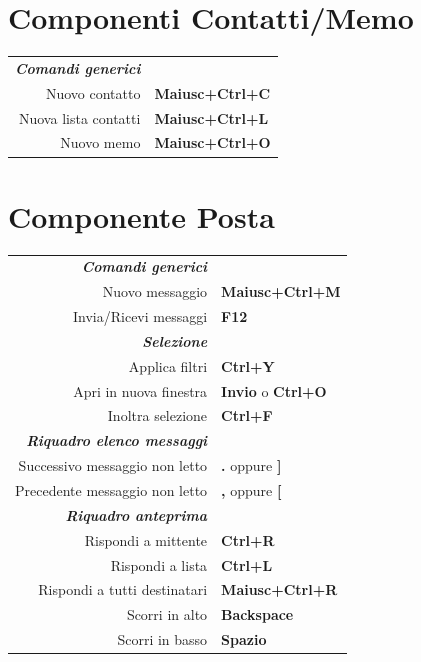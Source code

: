 \documentclass[12pt]{article}
\begin{document}
\begin{landscape}
\begin{center}
\begin{multicols}{2}
	\section*{Componenti Contatti/Memo}
	\begin{tabular*}{4in}{rp{1.5in}}
		\textit{\textbf{Comandi generici}}	&					\\
		Nuovo contatto				& \textbf{Maiusc+Ctrl+C}			\\
		Nuova lista contatti			& \textbf{Maiusc+Ctrl+L}			\\
		Nuovo memo				& \textbf{Maiusc+Ctrl+O}			\\
	\end{tabular*}
	\section*{Componente Posta}
	\begin{tabular*}{4in}{rp{1.5in}}
		\textit{\textbf{Comandi generici}}	&					\\
		Nuovo messaggio				& \textbf{Maiusc+Ctrl+M}			\\
		\vspace{1.5mm}
		Invia/Ricevi messaggi			& \textbf{F12}				\\
		\textit{\textbf{Selezione}}		&					\\
		Applica filtri				& \textbf{Ctrl+Y}			\\
		Apri in nuova finestra 			& \textbf{Invio} o \textbf{Ctrl+O}	\\
		\vspace{1.5mm}
		Inoltra selezione			& \textbf{Ctrl+F}			\\
		\textit{\textbf{Riquadro elenco messaggi}}	&					\\
		Successivo messaggio non letto		& \textbf{.} oppure \textbf{]}		\\
		\vspace{1.5mm}
		Precedente messaggio non letto		& \textbf{,} oppure \textbf{[}		\\
		\textit{\textbf{Riquadro anteprima}}	&					\\
		Rispondi a mittente			& \textbf{Ctrl+R}			\\
		Rispondi a lista			& \textbf{Ctrl+L}			\\
		Rispondi a tutti destinatari 		& \textbf{Maiusc+Ctrl+R}			\\
		Scorri in alto				& \textbf{Backspace}			\\
		Scorri in basso				& \textbf{Spazio}			\\
	\end{tabular*}

\end{multicols}
\end{center}
\end{landscape}
\end{document}
